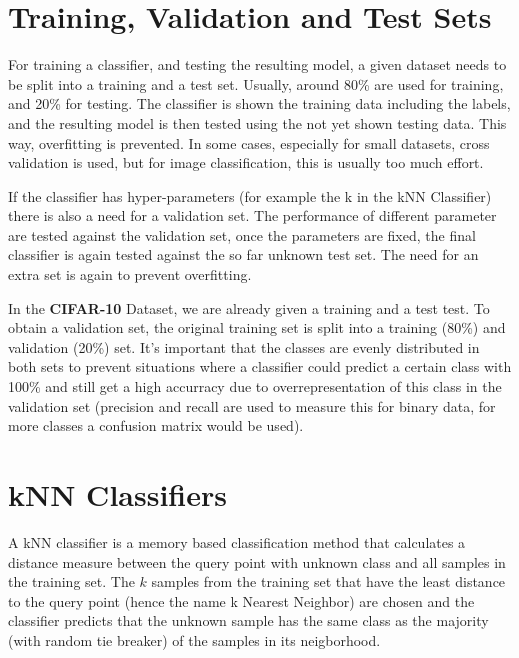 \section{Training, Validation and Test Sets} %
For training a classifier, and testing the resulting model, a given dataset needs to be split into a training and a test set. Usually, around 80\% are used for training, and 20\% for testing. The classifier is shown the training data including the labels, and the resulting model is then tested using the not yet shown testing data. This way, overfitting is prevented. In some cases, especially for small datasets, cross validation is used, but for image classification, this is usually too much effort. 

If the classifier has hyper-parameters (for example the k in the kNN Classifier) there is also a need for a validation set. The performance of different parameter are tested against the validation set, once the parameters are fixed, the final classifier is again tested against the so far unknown test set. The need for an extra set is again to prevent overfitting.

In the \textbf{CIFAR-10} Dataset, we are already given a training and a test test. To obtain a validation set, the original training set is split into a training (80\%) and validation (20\%) set. It's important that the classes are evenly distributed in both sets to prevent situations where a classifier could predict a certain class with 100\% and still get a high accurracy due to overrepresentation of this class in the validation set (precision and recall are used to measure this for binary data, for more classes a confusion matrix would be used).

\section{kNN Classifiers} %
A kNN classifier is a memory based classification method that calculates a distance measure between the query point with unknown class and all samples in the training set. The $k$ samples from the training set that have the least distance to the query point (hence the name k Nearest Neighbor) are chosen and the classifier predicts that the unknown sample has the same class as the majority (with random tie breaker) of the samples in its neigborhood.

